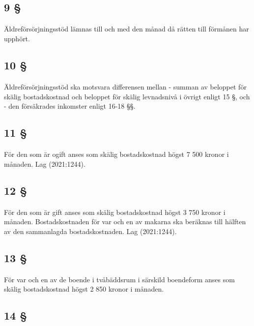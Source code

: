 \documentclass[a4paper,notitlepage,openany,10pt]{book}
\begin{document}
\subsection*{9 §}
\paragraph*{}
Äldreförsörjningsstöd lämnas till och med den månad då rätten till förmånen har upphört.
\subsection*{10 §}
\paragraph*{}
Äldreförsörjningsstöd ska motsvara differensen mellan
\newline - summan av beloppet för skälig bostadskostnad och beloppet för skälig levnadsnivå i övrigt enligt 15 §, och
\newline - den försäkrades inkomster enligt 16-18 §§.
\subsection*{11 §}
\paragraph*{}
För den som är ogift anses som skälig bostadskostnad högst 7 500 kronor i månaden.
Lag (2021:1244).
\subsection*{12 §}
\paragraph*{}
För den som är gift anses som skälig bostadskostnad högst 3 750 kronor i månaden. Bostadskostnaden för var och en av makarna ska beräknas till hälften av den sammanlagda bostadskostnaden.
Lag (2021:1244).
\subsection*{13 §}
\paragraph*{}
För var och en av de boende i tvåbäddsrum i särskild boendeform anses som skälig bostadskostnad högst 2 850 kronor i månaden.
\subsection*{14 §}
\end{document}
